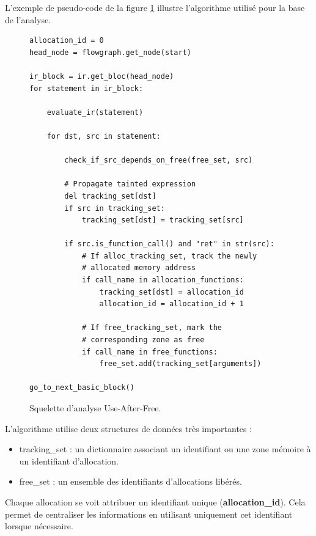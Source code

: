 L'exemple de pseudo-code de la figure \ref{fig:analyse} illustre l'algorithme utilisé pour la base de l'analyse.
\newpage
\begin{figure}[h!]
    \centering
    \begin {lstlisting}[frame=single]
allocation_id = 0
head_node = flowgraph.get_node(start)

ir_block = ir.get_bloc(head_node)
for statement in ir_block:

    evaluate_ir(statement)

    for dst, src in statement:

        check_if_src_depends_on_free(free_set, src)

        # Propagate tainted expression
        del tracking_set[dst]
        if src in tracking_set:
            tracking_set[dst] = tracking_set[src]

        if src.is_function_call() and "ret" in str(src):
            # If alloc_tracking_set, track the newly
            # allocated memory address
            if call_name in allocation_functions:
                tracking_set[dst] = allocation_id
                allocation_id = allocation_id + 1

            # If free_tracking_set, mark the
            # corresponding zone as free
            if call_name in free_functions:
                free_set.add(tracking_set[arguments])

go_to_next_basic_block()
    \end{lstlisting}
    \caption{Squelette d'analyse Use-After-Free.}
    \label{fig:analyse}
\end{figure}

L'algorithme utilise deux structures de données très importantes :

\begin{itemize}
        \item tracking\_set : un dictionnaire associant un identifiant ou une zone mémoire à un identifiant d'allocation.
        \item free\_set : un ensemble des identifiants d'allocations libérés.
\end{itemize}

Chaque allocation se voit attribuer un identifiant unique (\textbf{allocation\_id}). Cela permet de centraliser les informations
en utilisant uniquement cet identifiant lorsque nécessaire.

